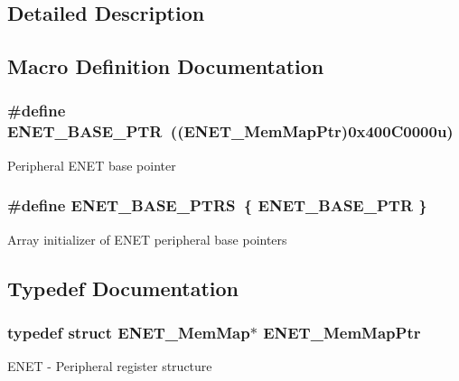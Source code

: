 \subsection{Detailed Description}


\subsection{Macro Definition Documentation}
\hypertarget{group___e_n_e_t___peripheral_gab64a2d991cc2bd76dd55ee25a52dcb5c}{}
\subsubsection[{E\+N\+E\+T\+\_\+\+B\+A\+S\+E\+\_\+\+P\+T\+R}]{\setlength{\rightskip}{0pt plus 5cm}\#define E\+N\+E\+T\+\_\+\+B\+A\+S\+E\+\_\+\+P\+T\+R~(({\bf E\+N\+E\+T\+\_\+\+Mem\+Map\+Ptr})0x400\+C0000u)}\label{group___e_n_e_t___peripheral_gab64a2d991cc2bd76dd55ee25a52dcb5c}
Peripheral E\+N\+E\+T base pointer \hypertarget{group___e_n_e_t___peripheral_gaa42b0a3bb4d738c4d78a36663b481ff8}{}
\subsubsection[{E\+N\+E\+T\+\_\+\+B\+A\+S\+E\+\_\+\+P\+T\+R\+S}]{\setlength{\rightskip}{0pt plus 5cm}\#define E\+N\+E\+T\+\_\+\+B\+A\+S\+E\+\_\+\+P\+T\+R\+S~\{ {\bf E\+N\+E\+T\+\_\+\+B\+A\+S\+E\+\_\+\+P\+T\+R} \}}\label{group___e_n_e_t___peripheral_gaa42b0a3bb4d738c4d78a36663b481ff8}
Array initializer of E\+N\+E\+T peripheral base pointers 

\subsection{Typedef Documentation}
\hypertarget{group___e_n_e_t___peripheral_gad26854f6c554b38dabbfc21ef7040890}{}
\subsubsection[{E\+N\+E\+T\+\_\+\+Mem\+Map\+Ptr}]{\setlength{\rightskip}{0pt plus 5cm}typedef struct {\bf E\+N\+E\+T\+\_\+\+Mem\+Map}$\ast$ {\bf E\+N\+E\+T\+\_\+\+Mem\+Map\+Ptr}}\label{group___e_n_e_t___peripheral_gad26854f6c554b38dabbfc21ef7040890}
E\+N\+E\+T -\/ Peripheral register structure 